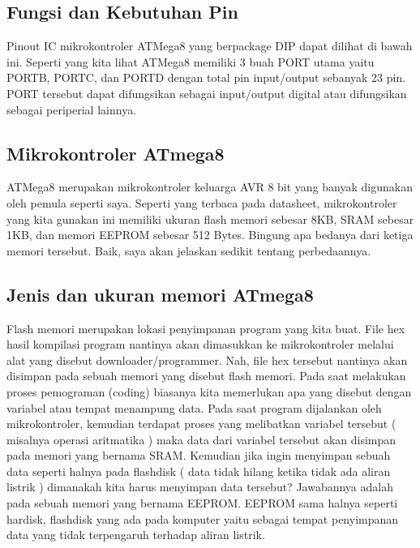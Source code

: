 	\subsection{Fungsi dan Kebutuhan Pin}
		Pinout IC mikrokontroler ATMega8 yang berpackage DIP dapat dilihat di bawah ini.
		Seperti yang kita lihat ATMega8 memiliki 3 buah PORT utama yaitu PORTB, PORTC, dan PORTD dengan total pin input/output sebanyak 23 pin. PORT tersebut dapat difungsikan sebagai input/output digital atau difungsikan sebagai periperial lainnya.
		
	\subsection{Mikrokontroler ATmega8}
		ATMega8 merupakan mikrokontroler keluarga AVR 8 bit yang banyak digunakan oleh pemula seperti saya. Seperti yang terbaca pada datasheet, mikrokontroler yang kita gunakan ini memiliki ukuran flash memori sebesar 8KB, SRAM sebesar 1KB, dan memori EEPROM sebesar 512 Bytes. Bingung apa bedanya dari ketiga memori tersebut. Baik, saya akan jelaskan sedikit tentang perbedaannya.
	\subsection{Jenis dan ukuran memori ATmega8}
		Flash memori merupakan lokasi penyimpanan program yang kita buat. File hex hasil kompilasi program nantinya akan dimasukkan ke mikrokontroler melalui alat yang disebut downloader/programmer. Nah, file hex tersebut nantinya akan disimpan pada sebuah memori yang disebut flash memori. Pada saat melakukan proses pemograman (coding) biasanya kita memerlukan apa yang disebut dengan variabel atau tempat menampung data.
		Pada saat program dijalankan oleh mikrokontroler, kemudian terdapat proses yang melibatkan variabel tersebut ( misalnya operasi aritmatika ) maka data dari variabel tersebut akan disimpan pada memori yang bernama SRAM. Kemudian jika ingin menyimpan sebuah data seperti halnya pada flashdisk ( data tidak hilang ketika tidak ada aliran listrik ) dimanakah kita harus menyimpan data tersebut? Jawabannya adalah pada sebuah memori yang bernama EEPROM. EEPROM sama halnya seperti hardisk, flashdisk yang ada pada komputer yaitu sebagai tempat penyimpanan data yang tidak terpengaruh terhadap aliran listrik.
